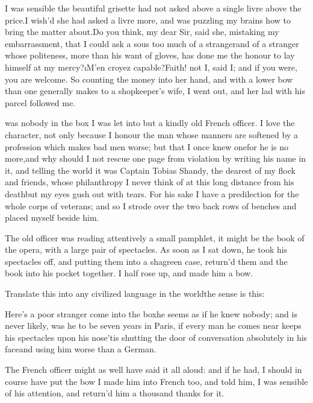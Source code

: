 \documentclass[twoside]{article}
\begin{document}
I was sensible the beautiful grisette had not asked above a single livre
above the price.\tsk I wish’d she had asked a livre more, and was puzzling my
brains how to bring the matter about.\tsk Do you think, my dear Sir, said
she, mistaking my embarrassment, that I could ask a sous too much of a
stranger\tsk and of a stranger whose politeness, more than his want of
gloves, has done me the honour to lay himself at my mercy?\tsk \i{M’en croyez
capable}?\tsk Faith! not I, said I; and if you were, you are welcome.  So
counting the money into her hand, and with a lower bow than one generally
makes to a shopkeeper’s wife, I went out, and her lad with his parcel
followed me.






 was nobody in the box I was let into but a kindly old French
officer.  I love the character, not only because I honour the man whose
manners are softened by a profession which makes bad men worse; but that
I once knew one\tsk for he is no more,\tsk and why should I not rescue one page
from violation by writing his name in it, and telling the world it was
Captain Tobias Shandy, the dearest of my flock and friends, whose
philanthropy I never think of at this long distance from his death\tsk but my
eyes gush out with tears.  For his sake I have a predilection for the
whole corps of veterans; and so I strode over the two back rows of
benches and placed myself beside him.

The old officer was reading attentively a small pamphlet, it might be the
book of the opera, with a large pair of spectacles.  As soon as I sat
down, he took his spectacles off, and putting them into a shagreen case,
return’d them and the book into his pocket together.  I half rose up, and
made him a bow.

Translate this into any civilized language in the world\tsk the sense is
this:

\lqq Here’s a poor stranger come into the box\tsk he seems as if he knew nobody;
and is never likely, was he to be seven years in Paris, if every man he
comes near keeps his spectacles upon his nose\tsk ’tis shutting the door of
conversation absolutely in his face\tsk and using him worse than a German.\rqq

The French officer might as well have said it all aloud: and if he had, I
should in course have put the bow I made him into French too, and told
him, \lqq I was sensible of his attention, and return’d him a thousand thanks
for it.\rqq
\end{document}
